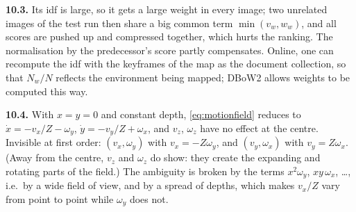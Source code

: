 \textbf{10.3.} Its idf is large, so it gets a large weight in every
image; two unrelated images of the test run then share a big common
term $\min(v_w,w_w)$, and all scores are pushed up and compressed
together, which hurts the ranking. The normalisation by the
predecessor's score partly compensates. Online, one can recompute the
idf with the keyframes of the map as the document collection, so that
$N_w/N$ reflects the environment being mapped; DBoW2 allows weights to
be computed this way.

\textbf{10.4.} With $x=y=0$ and constant depth, \eqref{eq:motionfield}
reduces to $\dot x=-v_x/Z-\omega_y$, $\dot y=-v_y/Z+\omega_x$, and $v_z$,
$\omega_z$ have no effect at the centre. Invisible at first order:
$(v_x,\omega_y)$ with $v_x=-Z\omega_y$, and $(v_y,\omega_x)$ with
$v_y=Z\omega_x$. (Away from the centre, $v_z$ and $\omega_z$ do show:
they create the expanding and rotating parts of the field.) The
ambiguity is broken by the terms $x^2\omega_y$, $xy\,\omega_x$, \dots,
i.e.\ by a wide field of view, and by a spread of depths, which makes
$v_x/Z$ vary from point to point while $\omega_y$ does not.
